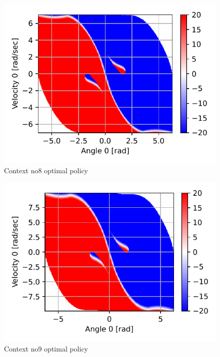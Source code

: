 \begin{figure}[p]
\begin{center}
\includegraphics[width=0.99\linewidth]{fig/c8_policy.pdf}
\caption{Context no8 optimal policy}\label{fig:c8_policy}
\end{center}
\end{figure}

\begin{figure}[p]
\begin{center}
\includegraphics[width=0.99\linewidth]{fig/c9_policy.pdf}
\caption{Context no9 optimal policy}\label{fig:c9_policy}
\end{center}
\end{figure}

